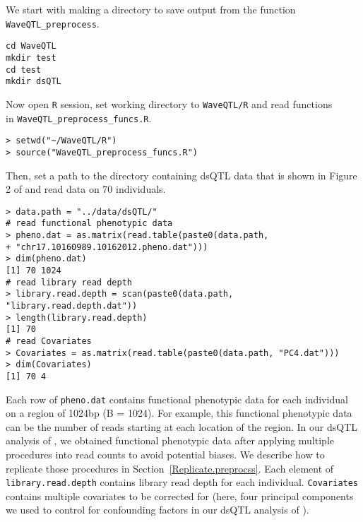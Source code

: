 \documentclass[11pt]{article}
\begin{document}
We start with making a directory to save output from the function {\tt WaveQTL\_preprocess}.
\begin{verbatim}
cd WaveQTL
mkdir test
cd test
mkdir dsQTL
\end{verbatim}
Now open {\tt R} session, set working directory to {\tt WaveQTL/R} and read functions \\in {\tt WaveQTL\_preprocess\_funcs.R}.
\begin{verbatim}
> setwd("~/WaveQTL/R")
> source("WaveQTL_preprocess_funcs.R")
\end{verbatim}
Then, set a path to the directory containing dsQTL data that is shown in Figure 2 of \cite{Shim2014} and read data on 70 individuals.
\begin{verbatim}
> data.path = "../data/dsQTL/"
# read functional phenotypic data 
> pheno.dat = as.matrix(read.table(paste0(data.path, 
+ "chr17.10160989.10162012.pheno.dat")))
> dim(pheno.dat)
[1] 70 1024
# read library read depth
> library.read.depth = scan(paste0(data.path, "library.read.depth.dat"))
> length(library.read.depth)
[1] 70
# read Covariates
> Covariates = as.matrix(read.table(paste0(data.path, "PC4.dat")))
> dim(Covariates)
[1] 70 4
\end{verbatim}
Each row of {\tt pheno.dat} contains functional phenotypic data for each individual on a region of 1024bp (B = 1024). For example, this functional phenotypic data can be the number of reads starting at each location of the region. In our dsQTL analysis of \cite{Shim2014}, we obtained functional phenotypic data after applying multiple procedures into read counts to avoid potential biases. We describe how to replicate those procedures in Section~\ref{Replicate.preprocss}. Each element of {\tt library.read.depth} contains library read depth for each individual. {\tt Covariates} contains multiple covariates to be corrected for (here, four principal components we used to control for confounding factors in our dsQTL analysis of \cite{Shim2014}). 
\end{document}
